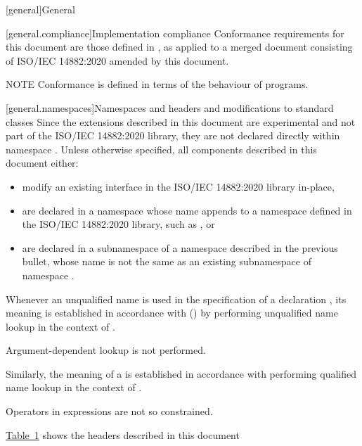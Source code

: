 [general]{General}

[general.compliance]{Implementation compliance}
Conformance requirements for this document are those defined in , as applied to a merged document consisting of ISO/IEC 14882:2020 amended by this document.

NOTE Conformance is defined in terms of the behaviour of programs.%

[general.namespaces]{Namespaces and headers and modifications to standard classes}
Since the extensions described in this document are experimental and not part of the ISO/IEC 14882:2020 library, they are not declared directly within namespace . Unless otherwise specified, all components described in this document either:

\begin{itemize}
    \item modify an existing interface in the ISO/IEC 14882:2020 library in-place,
    \item are declared in a namespace whose name appends  to a namespace defined in the ISO/IEC 14882:2020 library, such as , or
    \item are declared in a subnamespace of a namespace described in the previous bullet, whose name is not the same as an existing subnamespace of namespace .
\end{itemize}

Whenever an unqualified name is used
in the specification of a declaration ,
its meaning is established
in accordance with () by performing unqualified name lookup
in the context of .
\begin{note}
Argument-dependent lookup is not performed.\end{note}
Similarly, the meaning of a  is established
in accordance with performing qualified name lookup
in the context of .
\begin{note}
Operators in expressions are not so constrained.\end{note}

\hyperref[tab:C++ library headers]{Table~1} shows the headers described in this document

